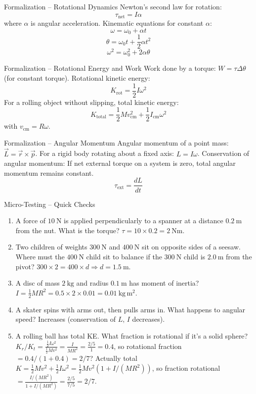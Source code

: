 \documentclass[11pt]{beamer}
\begin{document}
\begin{frame}{Formalization – Rotational Dynamics}
Newton's second law for rotation:
\[ \tau_{\text{net}} = I \alpha \]
where $\alpha$ is angular acceleration.
Kinematic equations for constant $\alpha$:
\[ \omega = \omega_0 + \alpha t \]
\[ \theta = \omega_0 t + \frac12 \alpha t^2 \]
\[ \omega^2 = \omega_0^2 + 2\alpha\theta \]
\end{frame}

\begin{frame}{Formalization – Rotational Energy and Work}
Work done by a torque: $W = \tau \Delta \theta$ (for constant torque).
Rotational kinetic energy:
\[ K_{\text{rot}} = \frac12 I \omega^2 \]
For a rolling object without slipping, total kinetic energy:
\[ K_{\text{total}} = \frac12 M v_{\text{cm}}^2 + \frac12 I_{\text{cm}} \omega^2 \]
with $v_{\text{cm}} = R\omega$.
\end{frame}

\begin{frame}{Formalization – Angular Momentum}
Angular momentum of a point mass: $\vec{L} = \vec{r} \times \vec{p}$.
For a rigid body rotating about a fixed axis: $L = I \omega$.
Conservation of angular momentum: If net external torque on a system is zero, total angular momentum remains constant.
\[ \tau_{\text{ext}} = \frac{dL}{dt} \]
\end{frame}

\begin{frame}{Micro-Testing – Quick Checks}
\begin{enumerate}
    \item A force of $10\ \mathrm{N}$ is applied perpendicularly to a spanner at a distance $0.2\ \mathrm{m}$ from the nut. What is the torque? \pause \alert{$\tau = 10\times0.2 = 2\ \mathrm{Nm}$}.
    \item Two children of weights $300\ \mathrm{N}$ and $400\ \mathrm{N}$ sit on opposite sides of a seesaw. Where must the $400\ \mathrm{N}$ child sit to balance if the $300\ \mathrm{N}$ child is $2.0\ \mathrm{m}$ from the pivot? \pause \alert{$300\times2 = 400\times d \Rightarrow d = 1.5\ \mathrm{m}$}.
    \item A disc of mass $2\ \mathrm{kg}$ and radius $0.1\ \mathrm{m}$ has moment of inertia? \pause \alert{$I = \frac12 MR^2 = 0.5\times2\times0.01 = 0.01\ \mathrm{kg\,m^2}$}.
    \item A skater spins with arms out, then pulls arms in. What happens to angular speed? \pause \alert{Increases (conservation of $L$, $I$ decreases)}.
    \item A rolling ball has total KE. What fraction is rotational if it's a solid sphere? \pause \alert{$K_r / K_t = \frac{\frac12 I\omega^2}{\frac12 M v^2} = \frac{I}{MR^2} = \frac{2/5}{1} = 0.4$, so rotational fraction $= 0.4/(1+0.4)=2/7$? Actually total $K = \frac12 Mv^2 + \frac12 I\omega^2 = \frac12 Mv^2(1 + I/(MR^2))$, so fraction rotational $= \frac{I/(MR^2)}{1 + I/(MR^2)} = \frac{2/5}{7/5} = 2/7$}.
\end{enumerate}
\end{frame}
\end{document}
